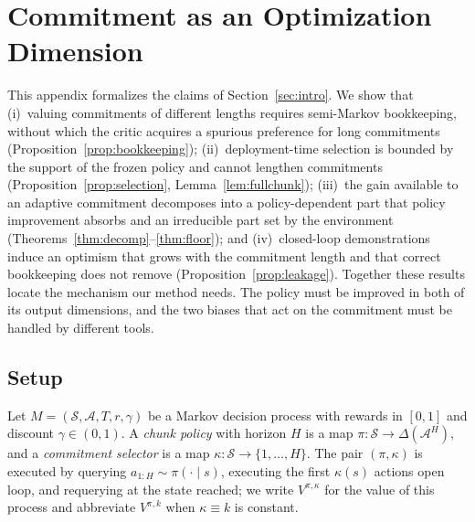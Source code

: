 
\section{Commitment as an Optimization Dimension}
\label{app:theory}

This appendix formalizes the claims of Section~\ref{sec:intro}. We show that
(i)~valuing commitments of different lengths requires semi-Markov bookkeeping, without which the
critic acquires a spurious preference for long commitments (Proposition~\ref{prop:bookkeeping});
(ii)~deployment-time selection is bounded by the support of the frozen policy and cannot lengthen
commitments (Proposition~\ref{prop:selection}, Lemma~\ref{lem:fullchunk});
(iii)~the gain available to an adaptive commitment decomposes into a policy-dependent part that
policy improvement absorbs and an irreducible part set by the environment
(Theorems~\ref{thm:decomp}--\ref{thm:floor}); and
(iv)~closed-loop demonstrations induce an optimism that grows with the commitment length and that
correct bookkeeping does not remove (Proposition~\ref{prop:leakage}).
Together these results locate the mechanism our method needs. The policy must be improved in both
of its output dimensions, and the two biases that act on the commitment must be handled by
different tools.

\subsection{Setup}
\label{app:setup}

Let $M=(\mathcal S,\mathcal A,T,r,\gamma)$ be a Markov decision process with rewards in $[0,1]$
and discount $\gamma\in(0,1)$. A \emph{chunk policy} with horizon $H$ is a map
$\pi\colon\mathcal S\to\Delta(\mathcal A^{H})$, and a \emph{commitment selector} is a map
$\kappa\colon\mathcal S\to\{1,\dots,H\}$. The pair $(\pi,\kappa)$ is executed by querying
$a_{1:H}\sim\pi(\cdot\mid s)$, executing the first $\kappa(s)$ actions open loop, and requerying at
the state reached; we write $V^{\pi,\kappa}$ for the value of this process and abbreviate
$V^{\pi,k}$ when $\kappa\equiv k$ is constant.

